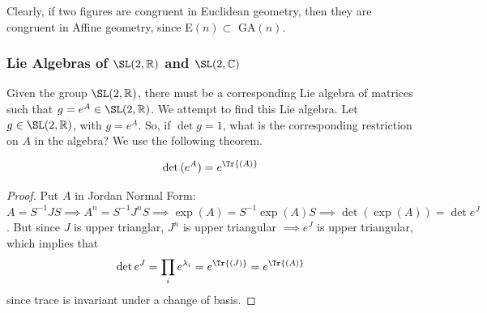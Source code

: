   Clearly, if two figures are congruent in Euclidean geometry, then they are congruent in Affine geometry, since E$(n) \subset$ GA$(n)$. 


\subsubsection[Lie Algebras of SL(2, R) and SL(2, C)]{Lie Algebras of $\SL(2, \mathbb{R})$ and $\SL(2, \mathbb{C})$}

  Given the group $\SL(2, \mathbb{R})$, there must be a corresponding Lie algebra of matrices such that $g = e^A \in \SL(2, \mathbb{R})$. We attempt to find this Lie algebra. Let $g \in \SL(2, \mathbb{R})$, with $g = e^A$. So, if $\det{g} = 1$, what is the corresponding restriction on $A$ in the algebra? We use the following theorem. 

  \begin{theorem}
    \label{thm:determinant-of-a-matrix-exponential}
    \begin{equation}
      \det{(e^A)} = e^{\Tr{(A)}}
    \end{equation}
  \end{theorem}
  \begin{proof}
    Put $A$ in Jordan Normal Form: $A = S^{-1} J S \implies A^n = S^{-1} J^n S \implies \exp(A) = S^{-1} \exp(A) S \implies \det{(\exp(A))} = \det{e^J}$. But since $J$ is upper trianglar, $J^n$ is upper triangular $\implies e^J$ is upper triangular, which implies that 
    \begin{equation}
      \det{e^J} = \prod_i e^{\lambda_i} = e^{\Tr{(J)}} = e^{\Tr{(A)}}
    \end{equation}
    since trace is invariant under a change of basis. 
  \end{proof}

